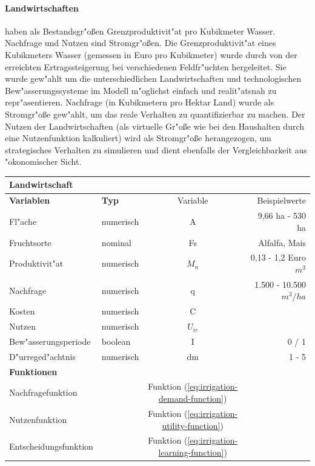 \documentclass[11pt,a4paper]{article}
\begin{document}
\paragraph{Landwirtschaften}haben als Bestandsgr"oßen Grenzproduktivit"at pro Kubikmeter Wasser. Nachfrage und Nutzen sind Stromgr"oßen. Die Grenzproduktivit"at eines Kubikmeters Wasser (gemessen in Euro pro Kubikmeter) wurde durch \cite{Salvador2011} von der erreichten Ertragssteigerung bei verschiedenen Feldfr"uchten hergeleitet. Sie wurde gew"ahlt um die unterschiedlichen Landwirtschaften und technologischen Bew"asserungssysteme im Modell m"oglichst einfach und realit"atsnah zu repr"asentieren. Nachfrage (in Kubikmetern pro Hektar Land) wurde als Stromgr"oße gew"ahlt, um das reale Verhalten zu quantifizierbar zu machen. Der Nutzen der Landwirtschaften (als virtuelle Gr"oße wie bei den Haushalten durch eine Nutzenfunktion kalkuliert) wird als Stromgr"oße herangezogen, um strategisches Verhalten zu simulieren und dient ebenfalls der Vergleichbarkeit aus "okonomischer Sicht.\\

\begin{tabular}[h]{|l|l|c|r|}
\hline \textbf{Landwirtschaft} & & & \\
\hline \textbf{Variablen} & \textbf{Typ} & Variable & Beispielwerte \\ 
\hline Fl"ache & numerisch & A & 9,66 ha - 530 ha \\
\hline Fruchtsorte & nominal & Fs & Alfalfa, Mais\\
\hline Produktivit"at & numerisch & $M_{n}$ & 0,13 - 1,2 Euro $m^{3}$\\
\hline Nachfrage & numerisch & q & 1.500 - 10.500 $m^{3} / ha$ \\
\hline Kosten & numerisch & C & \\
\hline Nutzen & numerisch & $U_{ir}$ & \\
\hline Bew"asserungsperiode & boolean & I & 0 / 1\\
\hline D"urreged"achtnis & numerisch & dm & 1 - 5\\
\hline \textbf{Funktionen} & & & \\
\hline Nachfragefunktion & & Funktion (\ref{eq:irrigation-demand-function}) & \\
\hline Nutzenfunktion & & Funktion (\ref{eq:irrigation-utility-function}) & \\
\hline Entscheidungsfunktion & & Funktion (\ref{eq:irrigation-learning-function}) & \\
\hline
\end{tabular}
\end{document}
